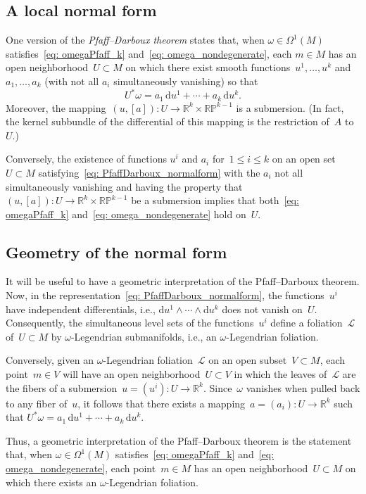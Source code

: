 \documentclass[pdftex]{sigma}
\renewcommand{\d}{\mathrm{d}}%
\newcommand{\cL}{{\mathcal L}}
\newcommand{\bbR}{{\mathbb R}}
\newcommand{\w}{\wedge}
\numberwithin{equation}{section}
\begin{document}
\subsection{A local normal form}
One version of the \emph{Pfaff--Darboux theorem}
\cite[Chapter II, Theorem~3.1]{MR1083148} states that,
when ${\omega\in\Omega^1(M)}$ satisfies~\eqref{eq: omegaPfaff_k}
and~\eqref{eq: omega_nondegenerate},
each $m\in M$
has an open neighborhood~$U\subset M$
on which there exist smooth functions~$u^1,\ldots,u^k$
and $a_1,\ldots,a_k$ (with not all $a_i$ simultaneously vanishing)
so that
\begin{equation}\label{eq: PfaffDarboux_normalform}
U^*\omega = a_1\,\d u^1 + \cdots + a_k\,\d u^k .
\end{equation}
Moreover,
the mapping~$(u,[a])\colon U\to\bbR^k\times\mathbb{RP}^{k-1}$
is a submersion. (In fact, the kernel subbundle of the differential
of this mapping is the restriction of~$A$ to~$U$.)

Conversely, the existence of functions $u^i$ and $a_i$ for~$1\le i\le k$
on an open set~$U\subset M$ satisfying~\eqref{eq: PfaffDarboux_normalform}
with the $a_i$ not all simultaneously vanishing and having the
property that $(u,[a]) \colon U\to\bbR^k\times\mathbb{RP}^{k-1}$
be a submersion implies that both~\eqref{eq: omegaPfaff_k}
and~\eqref{eq: omega_nondegenerate} hold on~$U$.

\subsection{Geometry of the normal form}
It will be useful to have a geometric interpretation
of the Pfaff--Darboux theorem.
Now, in the representation~\eqref{eq: PfaffDarboux_normalform},
the functions~$u^i$ have independent differentials,
i.e., $\d u^1\w\cdots\w\d u^k$ does not vanish on~$U$.
Consequently, the simultaneous level sets of the functions~$u^i$
define a foliation~$\cL$ of~$U\subset M$
by $\omega$-Legendrian submanifolds, i.e., an $\omega$-Legendrian foliation.

Conversely, given an $\omega$-Legendrian foliation~$\cL$
on an open subset~$V\subset M$, each point~$m\in V$ will
have an open neighborhood~$U\subset V$ in which the leaves of~$\cL$
are the fibers of a submersion~${u = (u^i) \colon U\to\bbR^k}$.
Since~$\omega$ vanishes when pulled back to any fiber of~$u$,
it follows that there exists a mapping~$a = (a_i) \colon U\to\bbR^k$
such that $U^*\omega = a_1\,\d u^1 + \cdots + a_k\,\d u^k$.

Thus, a geometric interpretation of the Pfaff--Darboux theorem
is the statement that,
when $\omega\in\Omega^1(M)$ satisfies~\eqref{eq: omegaPfaff_k}
and~\eqref{eq: omega_nondegenerate}, each point~$m\in M$
has an open neighborhood~$U\subset M$
on which there exists an $\omega$-Legendrian foliation.
\end{document}

